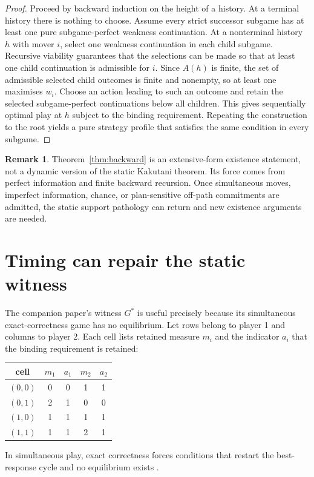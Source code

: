 \documentclass[11pt]{article}
\theoremstyle{definition}
\newtheorem{remark}[theorem]{Remark}
\begin{document}
\begin{proof}
Proceed by backward induction on the height of a history. At a terminal history there is nothing to choose. Assume every strict successor subgame has at least one pure subgame-perfect weakness continuation. At a nonterminal history $h$ with mover $i$, select one weakness continuation in each child subgame. Recursive viability guarantees that the selections can be made so that at least one child continuation is admissible for $i$. Since $A(h)$ is finite, the set of admissible selected child outcomes is finite and nonempty, so at least one maximises $w_i$. Choose an action leading to such an outcome and retain the selected subgame-perfect continuations below all children. This gives sequentially optimal play at $h$ subject to the binding requirement. Repeating the construction to the root yields a pure strategy profile that satisfies the same condition in every subgame.
\end{proof}

\begin{remark}
Theorem~\ref{thm:backward} is an extensive-form existence statement, not a dynamic version of the static Kakutani theorem. Its force comes from perfect information and finite backward recursion. Once simultaneous moves, imperfect information, chance, or plan-sensitive off-path commitments are admitted, the static support pathology can return and new existence arguments are needed.
\end{remark}

\section{Timing can repair the static witness}

The companion paper's witness $G^*$ is useful precisely because its simultaneous exact-correctness game has no equilibrium. Let rows belong to player 1 and columns to player 2. Each cell lists retained measure $m_i$ and the indicator $a_i$ that the binding requirement is retained:
\begin{center}
\begin{tabular}{ccccc}
\toprule
cell & $m_1$ & $a_1$ & $m_2$ & $a_2$\\
\midrule
$(0,0)$ & 0 & 0 & 1 & 1\\
$(0,1)$ & 2 & 1 & 0 & 0\\
$(1,0)$ & 1 & 1 & 1 & 1\\
$(1,1)$ & 1 & 1 & 2 & 1\\
\bottomrule
\end{tabular}
\end{center}
In simultaneous play, exact correctness forces conditions that restart the best-response cycle and no equilibrium exists \cite{schulzstatic}.
\end{document}
